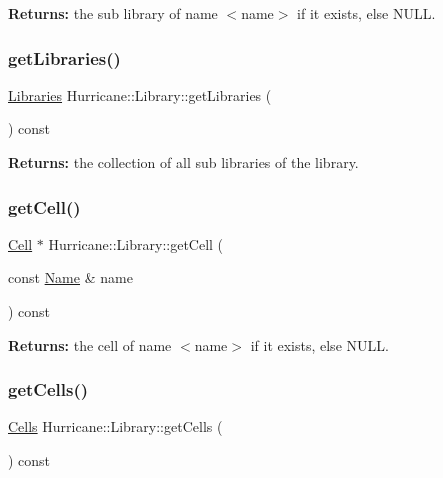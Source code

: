 {\bfseries Returns\+:} the sub library of name {\ttfamily $<$name$>$} if it exists, else N\+U\+LL. \mbox{\label{classHurricane_1_1Library_a43b3703b939b7e70261d1f9319db2bb0}} 
\subsubsection{\texorpdfstring{get\+Libraries()}{getLibraries()}}
{\footnotesize\ttfamily \mbox{\hyperlink{namespaceHurricane_a2868a53bbb0507710460ff02fab77cad}{Libraries}} Hurricane\+::\+Library\+::get\+Libraries (\begin{DoxyParamCaption}{ }\end{DoxyParamCaption}) const\hspace{0.3cm}{\ttfamily [inline]}}

{\bfseries Returns\+:} the collection of all sub libraries of the library. \mbox{\label{classHurricane_1_1Library_a2e6bb294c611db79e00a5a6ea00974d5}} 
\subsubsection{\texorpdfstring{get\+Cell()}{getCell()}}
{\footnotesize\ttfamily \mbox{\hyperlink{classHurricane_1_1Cell}{Cell}} $\ast$ Hurricane\+::\+Library\+::get\+Cell (\begin{DoxyParamCaption}\item[{const \mbox{\hyperlink{classHurricane_1_1Name}{Name}} \&}]{name }\end{DoxyParamCaption}) const\hspace{0.3cm}{\ttfamily [inline]}}

{\bfseries Returns\+:} the cell of name {\ttfamily $<$name$>$} if it exists, else N\+U\+LL. \mbox{\label{classHurricane_1_1Library_aae3e47aef08e50f9858fb79537f6eb41}} 
\subsubsection{\texorpdfstring{get\+Cells()}{getCells()}}
{\footnotesize\ttfamily \mbox{\hyperlink{namespaceHurricane_a8b4ab14b26f36f43d83a50294410b44a}{Cells}} Hurricane\+::\+Library\+::get\+Cells (\begin{DoxyParamCaption}{ }\end{DoxyParamCaption}) const\hspace{0.3cm}{\ttfamily [inline]}}


